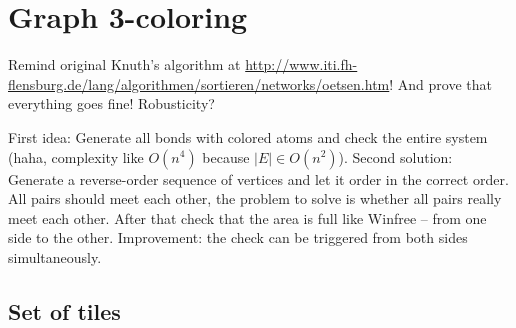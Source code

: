 \section{Graph 3-coloring}

Remind original Knuth's algorithm at \url{http://www.iti.fh-flensburg.de/lang/algorithmen/sortieren/networks/oetsen.htm}! And prove that everything goes fine! Robusticity? %

First idea: Generate all bonds with colored atoms and check the entire system (haha, complexity like $O(n^4)$ because $|E| \in O(n^2) $). Second solution: Generate a reverse-order sequence of vertices and let it order in the correct order. All pairs should meet each other, the problem to solve is whether all pairs really meet each other. After that check that the area is full like Winfree -- from one side to the other. Improvement: the check can be triggered from both sides simultaneously.

\subsection*{Set of tiles}

